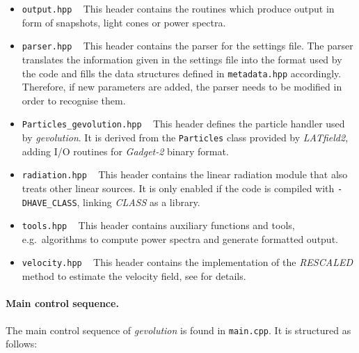 \documentclass[a4paper,10pt]{article}
\begin{document}
\begin{itemize}
 \item[] \hspace{-25pt}\texttt{output.hpp} ~ This header contains the routines which produce output in form of snapshots, light cones or power spectra.
 
 \item[] \hspace{-25pt}\texttt{parser.hpp} ~ This header contains the parser for the settings file. The parser translates the information
 given in the settings file into the format used by the code and fills the data structures defined in \texttt{metadata.hpp} accordingly.
 Therefore, if new parameters are added, the parser needs to be modified in order to recognise them.
 
 \item[] \hspace{-25pt}\texttt{Particles\_gevolution.hpp} ~ This header defines the particle handler used by \textit{gevolution}. It is
 derived from the \texttt{Particles} class provided by \textit{LATfield2}, adding I/O routines for \textit{Gadget-2} binary format.
 
 \item[] \hspace{-25pt}\texttt{radiation.hpp} ~ This header contains the linear radiation module that also treats other linear sources. It is only enabled if
 the code is compiled with \texttt{-DHAVE\_CLASS}, linking \textit{CLASS} as a library.
 
 \item[] \hspace{-25pt}\texttt{tools.hpp} ~ This header contains auxiliary functions and tools, e.g.\ algorithms to compute power spectra and generate formatted output.

 \item[] \hspace{-25pt}\texttt{velocity.hpp} ~ This header contains the implementation of the \textit{RESCALED} method to estimate the velocity field, see \cite{Jelic-Cizmek:2018gdp} for details.
\end{itemize}

\paragraph{Main control sequence.} The main control sequence of \textit{gevolution} is found in \texttt{main.cpp}. It is structured as follows:
\end{document}
